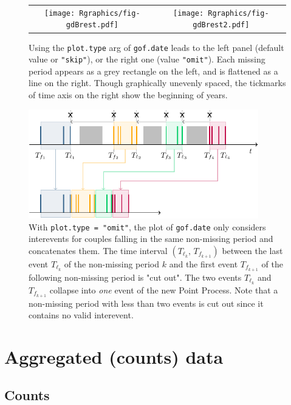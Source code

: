 \documentclass[a4paper]{report}
\begin{document}


\begin{figure}
  \centering
  \begin{tabular}{c c} 
    \texttt{[image: Rgraphics/fig-gdBrest.pdf]} &
    \texttt{[image: Rgraphics/fig-gdBrest2.pdf]} 
  \end{tabular}
  \caption{\label{gofBREST} Using the \texttt{plot.type} arg of
    \texttt{gof.date} leads to the left panel (default value or
    \texttt{"skip"}), or the right one (value \texttt{"omit"}).  Each
    missing period appears as a grey rectangle on the left, and is
    flattened as a line on the right. Though graphically unevenly
    spaced, the tickmarks of time axis on the right show the beginning of 
    years.  }
\end{figure}

\begin{figure}
  \centering
  \includegraphics[width=10cm]{images/KSomit.pdf}
  \caption{\label{KSomit} With \texttt{plot.type = "omit"}, the plot
    of \texttt{gof.date} only considers interevents for couples
    falling in the same non-missing period and concatenates them. The
    time interval $(T_{\ell_k},\,T_{f_{k+1}})$ between the last event
    $T_{\ell_k}$ of the non-missing period $k$ and the first event
    $T_{f_{k+1}}$ of the following non-missing period is "cut
    out". The two events $T_{\ell_k}$ and $T_{f_{k+1}}$ collapse into
    \textit{one} event of the new Point Process. Note that a
    non-missing period with less than two events is cut out since it
    contains no valid interevent.  }
\end{figure}

\section{Aggregated (counts) data}
\label{CountData}

\subsection{Counts}
\end{document}
